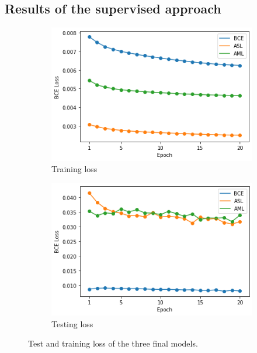 \subsection{Results of the supervised approach} \label{results_supervised}

\begin{figure}
  \begin{subfigure}[t]{.5\textwidth}
    \centering
    \includegraphics[width=\textwidth]{figures/supervised_approach/all_train_loss.png}
    \caption{Training loss}
    \label{fig:all_train_loss}
  \end{subfigure}
   \begin{subfigure}[t]{.5\textwidth}
    \centering
    \includegraphics[width=\textwidth]{figures/supervised_approach/all_test_loss.png}
    \caption{Testing loss}
    \label{fig:all_test_loss}
  \end{subfigure}
  \caption{Test and training loss of the three final models.}
  \label{fig:all_train}
\end{figure}

